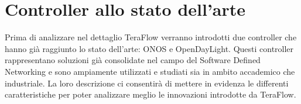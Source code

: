 

\section{Controller allo stato dell'arte}
Prima di analizzare nel dettaglio TeraFlow verranno introdotti due controller che hanno già raggiunto lo stato dell'arte: ONOS e OpenDayLight.
Questi controller rappresentano soluzioni già consolidate nel campo del Software Defined Networking e sono ampiamente utilizzati e studiati sia in ambito accademico che industriale.
La loro descrizione ci consentirà di mettere in evidenza le differenti caratteristiche per poter analizzare meglio le innovazioni introdotte da TeraFlow.


